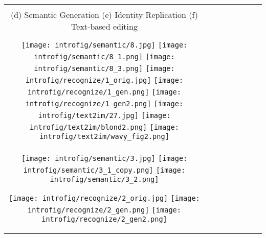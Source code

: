\documentclass[10pt,twocolumn,letterpaper]{article}
\begin{document}
{\begin{center}
{\begin{tabular}{c c c c c c c c  }
\vspace{1mm}
\tabularnewline
             {(d) Semantic Generation \hspace{90pt}(e)
        Identity Replication \hspace{90pt}(f)
        Text-based editing}\\
    \tabularnewline   
 \texttt{[image: introfig/semantic/8.jpg]} 
 \hspace{0.5mm}
  \texttt{[image: introfig/semantic/8\_1.png]}  \texttt{[image: introfig/semantic/8\_3.png]}
\hspace{2mm}
  \texttt{[image: introfig/recognize/1\_orig.jpg]}
  \hspace{0.5mm}
 \texttt{[image: introfig/recognize/1\_gen.png]}  \texttt{[image: introfig/recognize/1\_gen2.png]} 
 \hspace{2mm}
\texttt{[image: introfig/text2im/27.jpg]}
  \hspace{0.5mm}
 \texttt{[image: introfig/text2im/blond2.png]}  \texttt{[image: introfig/text2im/wavy\_fig2.png]} 
    \tabularnewline
\hspace{-0.8mm}
 \texttt{[image: introfig/semantic/3.jpg]}
  \hspace{0.5mm}
 \texttt{[image: introfig/semantic/3\_1\_copy.png]}  \texttt{[image: introfig/semantic/3\_2.png]} 


\hspace{2mm}
   \texttt{[image: introfig/recognize/2\_orig.jpg]}
  \hspace{0.5mm}
  \texttt{[image: introfig/recognize/2\_gen.png]}  \texttt{[image: introfig/recognize/2\_gen2.png]}  
 

\end{tabular}}
\end{center}}
\end{document}
